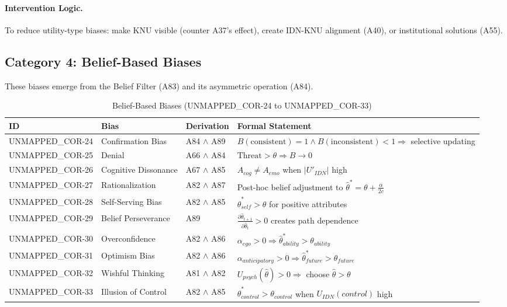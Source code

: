 \paragraph{Intervention Logic.} To reduce utility-type biases: make KNU visible (counter A37's effect), create IDN-KNU alignment (A40), or institutional solutions (A55).


\subsection{Category 4: Belief-Based Biases}

These biases emerge from the Belief Filter (A83) and its asymmetric operation (A84).

\begin{table}[htbp]
\small
\centering
\caption{Belief-Based Biases (UNMAPPED_COR-24 to UNMAPPED_COR-33)}
\label{tab:cor-belief}
\begin{tabular}{p{1.2cm}p{2.8cm}p{3.8cm}p{5cm}}
\toprule
\textbf{ID} & \textbf{Bias} & \textbf{Derivation} & \textbf{Formal Statement} \\
\midrule
UNMAPPED_COR-24 & Confirmation Bias & A84 $\land$ A89 & $B(\text{consistent}) = 1 \land B(\text{inconsistent}) < 1 \Rightarrow$ selective updating \\
UNMAPPED_COR-25 & Denial & A66 $\land$ A84 & $\text{Threat} > \theta \Rightarrow B \to 0$ \\
UNMAPPED_COR-26 & Cognitive Dissonance & A67 $\land$ A85 & $A_{cog} \neq A_{emo}$ when $|U'_{IDN}|$ high \\
UNMAPPED_COR-27 & Rationalization & A82 $\land$ A87 & Post-hoc belief adjustment to $\hat{\theta}^* = \theta + \frac{\alpha}{2c}$ \\
UNMAPPED_COR-28 & Self-Serving Bias & A82 $\land$ A85 & $\hat{\theta}^*_{self} > \theta$ for positive attributes \\
UNMAPPED_COR-29 & Belief Perseverance & A89 & $\frac{\partial \hat{\theta}_{t+1}}{\partial \hat{\theta}_t} > 0$ creates path dependence \\
UNMAPPED_COR-30 & Overconfidence & A82 $\land$ A86 & $\alpha_{ego} > 0 \Rightarrow \hat{\theta}^*_{ability} > \theta_{ability}$ \\
UNMAPPED_COR-31 & Optimism Bias & A82 $\land$ A86 & $\alpha_{anticipatory} > 0 \Rightarrow \hat{\theta}^*_{future} > \theta_{future}$ \\
UNMAPPED_COR-32 & Wishful Thinking & A81 $\land$ A82 & $U_{psych}(\hat{\theta}) > 0 \Rightarrow$ choose $\hat{\theta} > \theta$ \\
UNMAPPED_COR-33 & Illusion of Control & A82 $\land$ A85 & $\hat{\theta}^*_{control} > \theta_{control}$ when $U_{IDN}(control)$ high \\
\bottomrule
\end{tabular}
\end{table}


